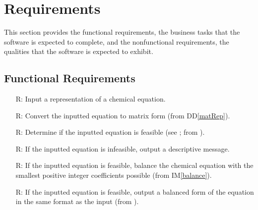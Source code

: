 \documentclass[12pt]{article}
\newcommand{\ddref}[1]{DD\ref{#1}}
\newcommand{\iref}[1]{IM\ref{#1}}
\newcounter{reqnum} %
\begin{document}

\newpage

\section{Requirements}
This section provides the functional requirements, the business tasks that the
software is expected to complete, and the nonfunctional requirements, the
qualities that the software is expected to exhibit.

\subsection{Functional Requirements} \label{sec_funcReqs}

\begin{itemize}

  \item[R\refstepcounter{reqnum}\thereqnum \label{R_input}:] Input a
    representation of a chemical equation.

  \item[R\refstepcounter{reqnum}\thereqnum \label{R_convert}:] Convert the
    inputted equation to matrix form (from \ddref{matRep}).

  \item[R\refstepcounter{reqnum}\thereqnum \label{R_feasible}:] Determine if the
    inputted equation is feasible (see ;	from
    ).

  \item[R\refstepcounter{reqnum}\thereqnum \label{R_infeasOutput}:] If the
    inputted equation is infeasible, output a descriptive message.

  \item[R\refstepcounter{reqnum}\thereqnum \label{R_balance}:] If the
    inputted equation is feasible, balance the chemical equation with the smallest
    positive integer coefficients possible (from \iref{balance}).

  \item[R\refstepcounter{reqnum}\thereqnum \label{R_feasOutput}:] If the
    inputted equation is feasible, output a balanced form of the equation in the
    same format as the input (from ).

\end{itemize}
\end{document}
